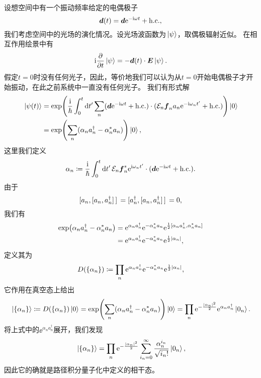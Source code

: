 设想空间中有一个振动频率给定的电偶极子
\begin{equation}
    \vb*{d}(t) = \vb*{d} \mathrm{e}^{- \mathrm{i} \omega t } + \text{h.c.},
\end{equation}
我们考虑空间中的光场的演化情况。设光场波函数为$\ket*{\psi}$，取偶极辐射近似。
在相互作用绘景中有
\begin{equation}
    \mathrm{i} \pdv{t} \ket*{\psi} = - \vb*{d}(t) \cdot \vb*{E} \ket*{\psi}.
\end{equation}
假定$t=0$时没有任何光子，因此，等价地我们可以认为从$t=0$开始电偶极子才开始振动，在此之前系统中一直没有任何光子。
我们有形式解
\[
    \begin{aligned}
        \ket*{\psi(t)} &= \exp(\frac{\mathrm{i}}{\hbar} \int_0^t \dd{t'} \sum_n (\vb*{d} \mathrm{e}^{- \mathrm{i} \omega t } + \text{h.c.}) \cdot (\mathcal{E}_n \vb*{f}_n a_n \mathrm{e}^{- \mathrm{i} \omega_n t'} + \text{h.c.}) ) \ket*{0} \\
        &= \exp(\sum_n (\alpha_n a_n^\dagger - \alpha_n^* a_n) ) \ket*{0},
    \end{aligned}
\]
这里我们定义
\begin{equation}
    \alpha_n \coloneqq \frac{\mathrm{i}}{\hbar} \int_0^t \dd{t'} \mathcal{E}_n \vb*{f}_n^* \mathrm{e}^{\mathrm{i} \omega_n t'} \cdot (\vb*{d} \mathrm{e}^{- \mathrm{i} \omega t} + \text{h.c.}).
\end{equation}
由于
\[
    \comm*{a_n}{\comm*{a_n}{a^\dagger_n}} = \comm*{a^\dagger_n}{\comm*{a_n}{a^\dagger_n}} = 0,
\]
我们有
\[
    \begin{aligned}
        \exp(\alpha_n a_n^\dagger - \alpha_n^* a_n) &= \ee^{\alpha_n a_n^\dagger} \ee^{- \alpha_n^* a_n} \ee^{\frac{1}{2} \comm*{\alpha_n a_n^\dagger}{\alpha_n^* a_n}} \\
        &= \ee^{\alpha_n a_n^\dagger} \ee^{- \alpha_n^* a_n} \ee^{\frac{1}{2} \abs{\alpha_n}},
    \end{aligned}
\]
定义其为
\begin{equation}
    D(\{\alpha_n\}) \coloneqq \prod_n \mathrm{e}^{\alpha_n a_n^\dagger} \mathrm{e}^{- \alpha_n^* a_n} \mathrm{e}^{\frac{1}{2} \abs{\alpha_n}},
\end{equation}
它作用在真空态上给出
\begin{equation}
    \ket*{\{\alpha_n\}} \coloneqq D(\{\alpha_n\}) \ket*{0} = \exp(\sum_n (\alpha_n a_n^\dagger - \alpha_n^* a_n) ) \ket*{0} = \prod_n \mathrm{e}^{- \frac{\abs{\alpha_n}^2}{2}} \mathrm{e}^{\alpha_n a^\dagger_n} \ket*{0_n}.
\end{equation}
将上式中的$\ee^{\alpha_n a^\dagger_n}$展开，我们发现
\begin{equation}
    \ket*{\{\alpha_n\}} = \prod_n \mathrm{e}^{- \frac{\abs{\alpha_n}^2}{2}} \sum_{i_n=0}^\infty \frac{\alpha_n^{i_n}}{\sqrt{i_n!}} \ket*{0_n},
\end{equation}
因此它的确就是路径积分量子化中定义的相干态。

